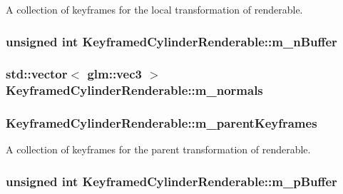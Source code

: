 A collection of keyframes for the local transformation of renderable. \hypertarget{classKeyframedCylinderRenderable_a73db5a6ed8d7452244834ef396cb0279}{
\subsubsection[{m\+\_\+n\+Buffer}]{\setlength{\rightskip}{0pt plus 5cm}unsigned int Keyframed\+Cylinder\+Renderable\+::m\+\_\+n\+Buffer\hspace{0.3cm}{\ttfamily [private]}}}\label{classKeyframedCylinderRenderable_a73db5a6ed8d7452244834ef396cb0279}
\hypertarget{classKeyframedCylinderRenderable_a4d306f63513ee46874d65078fb041a52}{
\subsubsection[{m\+\_\+normals}]{\setlength{\rightskip}{0pt plus 5cm}std\+::vector$<$ glm\+::vec3 $>$ Keyframed\+Cylinder\+Renderable\+::m\+\_\+normals\hspace{0.3cm}{\ttfamily [private]}}}\label{classKeyframedCylinderRenderable_a4d306f63513ee46874d65078fb041a52}
\hypertarget{classKeyframedCylinderRenderable_afcb8c6b8048454621f6375a1eebb2ca1}{
\subsubsection[{m\+\_\+parent\+Keyframes}]{ Keyframed\+Cylinder\+Renderable\+::m\+\_\+parent\+Keyframes\hspace{0.3cm}{\ttfamily [private]}}}\label{classKeyframedCylinderRenderable_afcb8c6b8048454621f6375a1eebb2ca1}
A collection of keyframes for the parent transformation of renderable. \hypertarget{classKeyframedCylinderRenderable_ae72ab893df021692d8c4e4d8e7081931}{
\subsubsection[{m\+\_\+p\+Buffer}]{\setlength{\rightskip}{0pt plus 5cm}unsigned int Keyframed\+Cylinder\+Renderable\+::m\+\_\+p\+Buffer\hspace{0.3cm}{\ttfamily [private]}}}\label{classKeyframedCylinderRenderable_ae72ab893df021692d8c4e4d8e7081931}
